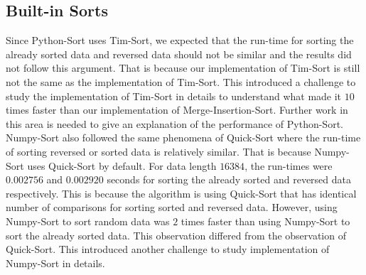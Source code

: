\documentclass[sigconf, nonacm, natbib, screen, balance=False]{acmart}
\begin{document}
\subsection{Built-in Sorts}\label{sec:builtin-disc}
Since Python-Sort uses Tim-Sort, we expected that the run-time for sorting the already sorted data and reversed data should not be similar and the results did not follow this argument. That is because our implementation of Tim-Sort is still not the same as the \citet{cpythonsourcecode} implementation of Tim-Sort. This introduced a challenge to study the \citet{cpythonsourcecode} implementation of Tim-Sort in details to understand what made it $10$ times faster than our implementation of Merge-Insertion-Sort. Further work in this area is needed to give an explanation of the performance of Python-Sort. 
Numpy-Sort also followed the same phenomena of Quick-Sort where the run-time of sorting reversed or sorted data is relatively similar. That is because Numpy-Sort uses Quick-Sort by default. For data length $16384$, the run-times were $0.002756$ and $0.002920$ seconds for sorting the already sorted and reversed data respectively. This is because the algorithm is using Quick-Sort that has identical number of comparisons for sorting sorted and reversed data. However, using Numpy-Sort to sort random data was $2$ times faster than using Numpy-Sort to sort the already sorted data. This observation differed from the observation of Quick-Sort. This introduced another challenge to study \citet{harris2020array} implementation of Numpy-Sort in details.
\end{document}
